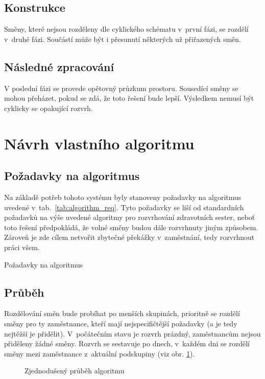 \documentclass[twoside]{ctuthesis}
\begin{document}
\subsection{Konstrukce}
Směny, které nejsou rozděleny dle cyklického schématu v~první fázi, se rozdělí v~druhé fázi. Součástí může být i přesunutí některých už přiřazených směn.

\subsection{Následné zpracování}
V poslední fázi se provede opětovný průzkum prostoru. Sousedící směny se mohou přeházet, pokud se zdá, že toto řešení bude lepší. Výsledkem nemusí být cyklicky se opakující rozvrh.

\newpage
\section{Návrh vlastního algoritmu}

\subsection{Požadavky na algoritmus}
Na základě potřeb tohoto systému byly stanoveny požadavky na algoritmus uvedené v~tab.~\ref{tab:algorithm_req}. Tyto požadavky se liší od standardních požadavků na výše uvedené algoritmy pro rozvrhování zdravotních sester, neboť toto řešení předpokládá, že volné směny budou dále rozvrhnuty jiným způsobem. Zároveň je zde cílem netvořit zbytečné překážky v~zaměstnání, tedy rozvrhnout práci všem.

\begin{table}[h!]
	
	\caption{Požadavky na algoritmus}
	\label{tab:algorithm_req}
\end{table}

\subsection{Průběh}
Rozdělování směn bude probíhat po menších skupinách, prioritně se rozdělí směny pro ty zaměstnance, kteří mají nejspecifičtější požadavky (a je tedy nejtěžší je přidělit). V~počátečním stavu je rozvrh prázdný, zaměstnancům nejsou přiděleny žádné směny. Rozvrh se sestavuje po dnech, v~každém dni se rozdělí směny mezi zaměstnance z~aktuální podskupiny (viz obr. \ref{fig:dayflow}).

\begin{figure}[h]
	
	\caption{Zjednodušený průběh algoritmu}
	\label{fig:dayflow}
\end{figure}
\end{document}
